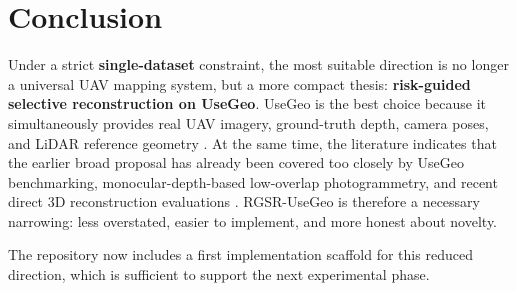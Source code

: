 \documentclass[11pt,a4paper]{article}
\begin{document}
\section{Conclusion}

Under a strict \textbf{single-dataset} constraint, the most suitable direction is no longer a universal UAV mapping system, but a more compact thesis: \textbf{risk-guided selective reconstruction on UseGeo}. UseGeo is the best choice because it simultaneously provides real UAV imagery, ground-truth depth, camera poses, and LiDAR reference geometry \citep{Nex2024UseGeo}. At the same time, the literature indicates that the earlier broad proposal has already been covered too closely by UseGeo benchmarking, monocular-depth-based low-overlap photogrammetry, and recent direct 3D reconstruction evaluations \citep{Hermann2024UseGeoEval,Zhong2025LowOverlap,Guo2025SfMGuided,Wu2025AerialBlocks}. RGSR-UseGeo is therefore a necessary narrowing: less overstated, easier to implement, and more honest about novelty.

The repository now includes a first implementation scaffold for this reduced direction, which is sufficient to support the next experimental phase.

\nocite{Jiang2022Leveraging,Jiang2022Parallel,Ye2024coarse,Wu2024UAV,Shen2025Aerial,Lateef2025GPS,Wang2025VecMapLocNet,Wei2024LiDeNeRF,Yu2021Automatic,Xu2021Robust,Zheng2018multi,Wu2018Integration,Zhang2018patch,Liu2025ARTEMIS,Li2024Drone}



\end{document}
